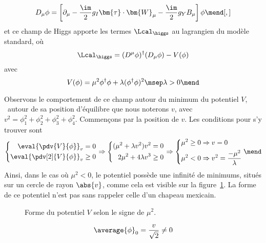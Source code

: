 \begin{equation}
D_\mu \phi = \left[ \partial_\mu - \frac{\im}{2}g_I \bm{\tau}\cdot\bm{W}_\mu - \frac{\im}{2}g_YB_\mu \right] \phi
\mend[,]
\end{equation}
et ce champ de Higgs apporte les termes $\Lcal_{\higgs}$ au lagrangien du modèle standard, où
\begin{equation}
\Lcal_{\higgs} = (D^\mu\phi)^\dagger(D_\mu\phi) - V(\phi)
\end{equation}
avec
\begin{equation}
V(\phi)
= \mu^2\phi^\dagger\phi + \lambda (\phi^\dagger\phi)^2
\msep \lambda > 0
\mend
\end{equation}
\par Observons le comportement de ce champ autour du minimum du potentiel $V$, \ie\ autour de sa position d'équilibre que nous noterons $v$, avec $v^2=\phi_1^2+\phi_2^2+\phi_3^2+\phi_4^2$.
Commençons par la position de $v$. Les conditions pour s'y trouver sont
\begin{equation}
\left\lbrace
\begin{aligned}
\eval{\pdv{V}{\phi}}_v=0
\\
\eval{\pdv[2]{V}{\phi}}_v\geq0
\end{aligned}
\right.
\Rightarrow
\left\lbrace
\begin{aligned}
(\mu^2 + \lambda v^2)v^2 = 0
\\
2\mu^2 + 4\lambda v^3 \geq0
\end{aligned}
\right.
\Rightarrow
\left\lbrace
\begin{aligned}
\mu^2 \geq 0 &\Rightarrow v = 0
\\
\mu^2 < 0 &\Rightarrow v^2 = \frac{-\mu^2}{\lambda}
\end{aligned}
\right.
\mend
\end{equation}
Ainsi, dans le cas où $\mu^2<0$, le potentiel possède une infinité de minimums, situés sur un cercle de rayon $\abs{v}$, comme cela est visible sur la figure~\ref{fig-rpztation_3d_V_Higgs}. La forme de ce potentiel n'est pas sans rappeler celle d'un chapeau mexicain.
\begin{figure}[h]
\centering

\caption{Forme du potentiel $V$ selon le signe de $\mu^2$.}
\label{fig-rpztation_3d_V_Higgs}
\end{figure}
\par {}
\begin{equation}
\average{\phi}_0 = \frac{v}{\sqrt{2}} \neq 0
\end{equation}
